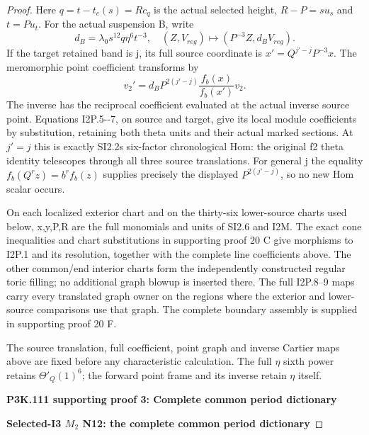 \begin{proof}
Here \(q=t-t_c(s)=R c_q\) is the actual selected height,
\(R-P=s u_s\) and \(t=P u_t\). For the actual suspension B, write
\[
 d_B=\lambda_0s^{12}q\eta^6t^{-3},\quad
 (Z,V_{reg})\longmapsto(P^{-3}Z,d_B V_{reg}).             \tag{I2P.8}
\]
If the target retained band is j\textquotesingle, its full source coordinate is
\(x'=Q^{j'-j}P^{-3}x\). The meromorphic point coefficient transforms by
\[
 v_2'=d_B P^{2(j'-j)}\frac{f_b(x)}{f_b(x')}v_2.          \tag{I2P.9}
\]
The inverse has the reciprocal coefficient evaluated at the actual
inverse source point. Equations I2P.5-\/-7, on source and target, give
its local module coefficients by substitution, retaining both theta
units and their actual marked sections. At \(j'=j\) this is exactly
SI2.2\textquotesingle s six-factor chronological Hom: the original f2 theta identity
telescopes through all three source translations. For general j\textquotesingle{}
the equality \(f_b(Q^r z)=b^r f_b(z)\) supplies precisely the displayed
\(P^{2(j'-j)}\), so no new Hom scalar occurs.

On each localized exterior chart and on the thirty-six lower-source
charts used below, x,y,P,R are the full monomials and units of SI2.6
and I2M.  The exact cone inequalities and chart substitutions in
supporting proof 20 C give morphisms to I2P.1 and its resolution,
together with the complete line coefficients above.  The other
common/end interior charts form the independently constructed
regular toric filling; no additional graph blowup is inserted there.
The full I2P.8--9 maps carry every translated graph owner on the
regions where the exterior and lower-source comparisons use that
graph.  The complete boundary assembly is supplied in supporting
proof 20 F.

The source translation, full coefficient, point graph and inverse
Cartier maps above are fixed before any characteristic calculation.
The full \(\eta\) sixth power retains \(\Theta'_Q(1)^{6}\); the forward
point frame and its inverse retain \(\eta\) itself.




\par\bigskip\noindent\textbf{P3K.111 supporting proof 3: Complete common period dictionary}\par\nobreak
\par

\medskip\noindent\textbf{Selected-I3 \(M_{2}\) N12: the complete common period dictionary}


\end{proof}
